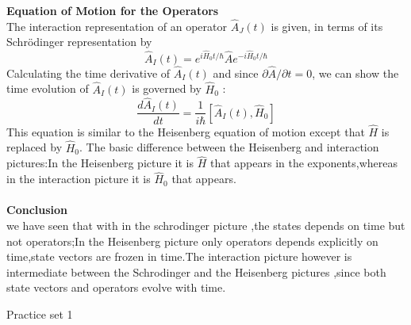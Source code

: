 \textbf{Equation of Motion for the Operators}\\
The interaction representation of an operator $\hat{A}_{J}(t)$ is given, in terms of its Schrödinger representation by
$$
\hat{A}_{I}(t)=e^{i \hat{H}_{0} t / \hbar} \hat{A} e^{-i \hat{H}_{0} t / \hbar}
$$
Calculating the time derivative of $\hat{A}_{I}(t)$ and since $\partial \hat{A} / \partial t=0$, we can show the time evolution of $\hat{A}_{I}(t)$ is governed by $\hat{H}_{0}$ :
$$
\frac{d \hat{A}_{I}(t)}{d t}=\frac{1}{i \hbar}\left[\hat{A}_{I}(t), \hat{H}_{0}\right]
$$
This equation is similar to the Heisenberg equation of motion except that $\hat{H}$ is replaced by $\hat{H}_{0}$. The basic difference between the Heisenberg and interaction pictures:In the Heisenberg picture it is $\hat{H}$ that appears in the exponents,whereas in the interaction picture it is $\hat{H}_0$ that appears.\\\\
\textbf{Conclusion}\\
 we have seen that with in the schrodinger picture ,the states depends on time but not operators;In the Heisenberg picture only operators depends explicitly on time,state vectors are frozen in time.The interaction picture however is intermediate between the Schrodinger and the Heisenberg pictures ,since both state vectors and operators evolve with time.\\
 \newpage
 \begin{abox}
 	Practice set 1
 	\end{abox}
